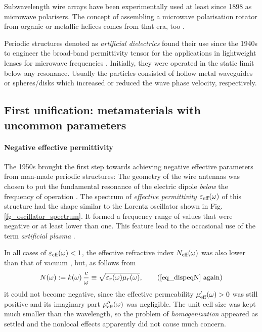 Subwavelength wire arrays have been experimentally used at least since 1898 as microwave polarisers. The concept of assembling a microwave polarisation rotator from organic or metallic helices comes from that era, too \cite{bose1898rotation, emerson}.

Periodic structures denoted as \textit{artificial dielectrics} \cite{brown1955properties} found their use since the 1940s to engineer the broad-band permittivity tensor for the applications in lightweight lenses for microwave frequencies \cite{kock1948metallic}. Initially, they were operated in the static limit below any resonance. Usually the particles consisted of hollow metal waveguides or spheres/disks which increased or reduced the wave phase velocity, respectively. 


\subsection{First unification: metamaterials with uncommon parameters} 
\paragraph{Negative effective permittivity} %
The 1950s brought the first step towards achieving negative effective parameters from man-made periodic structures: The geometry of the wire antennas was chosen to put the fundamental resonance of the electric dipole \textit{below} the frequency of operation \cite{rotman1962plasma,boardman2005negative}. The spectrum of \textit{effective permittivity} $\varepsilon_{\text{eff} }(\omega)$ of this structure had the shape similar to the Lorentz oscillator shown in Fig. \ref{fg_oscillator_spectrum}. It formed a frequency range of values that were negative or at least lower than one. This feature lead to the occasional use of the term \textit{artificial plasma} \cite{merkel1973simulation}. 

In all cases of $\varepsilon_{\text{eff} }(\omega)<1$, the effective refractive index $N_{\text{eff} }(\omega)$ was also lower than that of vacuum \cite{brown1953artificial}, but, as follows from
\begin{equation} N(\omega) := k(\omega) \, \frac{c}{\omega} \equiv \sqrt{\epsrl(\omega)\murl(\omega)}, \tag{\ref{eq_dispeqN} \again} \end{equation}
	it could not become negative, since the effective permeability $\mu_{\text{eff} }'(\omega) > 0$ was still positive and its imaginary part $\mu_{\text{eff} }''(\omega)$ was negligible. The unit cell size was kept much smaller than the wavelength, so the problem of \textit{homogenization} appeared as settled and the nonlocal effects apparently did not cause much concern.

